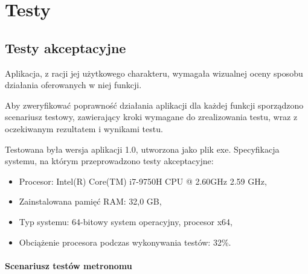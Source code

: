 \chapter{Testy}
\section{Testy akceptacyjne}
Aplikacja, z racji jej użytkowego charakteru, wymagała wizualnej oceny sposobu działania oferowanych w niej funkcji.

Aby zweryfikować poprawność działania aplikacji dla każdej funkcji sporządzono scenariusz testowy, zawierający kroki wymagane do zrealizowania testu, wraz z oczekiwanym rezultatem i wynikami testu.

Testowana była wersja aplikacji 1.0, utworzona jako plik exe. 
Specyfikacja systemu, na którym przeprowadzono testy akceptacyjne:

\begin{itemize}
    \item Procesor: Intel(R) Core(TM) i7-9750H CPU @ 2.60GHz 2.59 GHz, 
    \item Zainstalowana pamięć RAM: 32,0 GB,
    \item Typ systemu: 64-bitowy system operacyjny, procesor x64,
    \item Obciążenie procesora podczas wykonywania testów: 32\%.
\end{itemize}

\subsubsection{Scenariusz testów metronomu}

